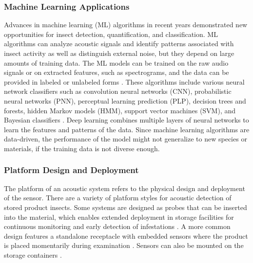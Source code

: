 \documentclass[../Vibro-Acoustic Signatures and Detection Algorithms for Stored Product Insects.tex]{subfiles}
\begin{document}
\subsubsection{Machine Learning Applications}

Advances in machine learning (ML) algorithms in recent years demonstrated new opportunities for insect detection, quantification, and classification. ML algorithms can analyze acoustic signals and identify patterns associated with insect activity as well as distinguish external noise, but they depend on large amounts of training data. The ML models can be trained on the raw audio signals or on extracted features, such as spectrograms, and the data can be provided in labeled or unlabeled forms \cite{faissAdaptiveRepresentationsSound2023, kohlbergBuzzesBytesSystematic2024}. These algorithms include various neural network classifiers such as convolution neural networks (CNN), probabilistic neural networks (PNN), perceptual learning prediction (PLP), decision trees and forests, hidden Markov models (HMM), support vector machines (SVM), and Bayesian classifiers \cite{mainettiAcousticIdentificationWoodBoring,potamitisAutomaticBioacousticDetection2009,mankinAutomatedApplicationsAcoustics2021, balingbingDeterminingSoundSignatures2024}. Deep learning combines multiple layers of neural networks to learn the features and patterns of the data. Since machine learning algorithms are data-driven, the performance of the model might not generalize to new species or materials, if the training data is not diverse enough.

\subsubsection{Platform Design and Deployment}

The platform of an acoustic system refers to the physical design and deployment of the sensor. There are a variety of platform styles for acoustic detection of stored product insects. Some systems are designed as probes that can be inserted into the material, which enables extended deployment in storage facilities for continuous monitoring and early detection of infestations \cite{hagstrumAcousticalMonitoringRhyzopertha1990, fleurat-lessardAcousticDetectionAutomatic2006,muller-blenkleMethodAcousticStorage2023}. A more common design features a standalone receptacle with embedded sensors where the product is placed momentarily during examination \cite{vickSoundDetectionStoredProduct1988,webbAcousticalSystemDetect1988, shumanQuantitativeAcousticalDetection1993, mankinAutomatedApplicationsAcoustics2021}. Sensors can also be mounted on the storage containers \cite{mankinPerspectivePromiseCentury2011}.
\end{document}

